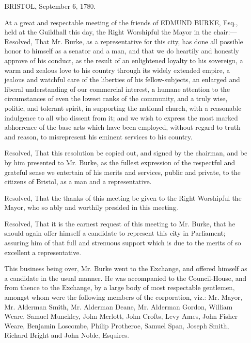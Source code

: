 \begin{itpars}
\hfill
BRISTOL, September 6, 1780.

At a great and respectable meeting of the friends of EDMUND BURKE, Esq., held at the Guildhall this day, the Right Worshipful the Mayor in the chair:—Resolved, That Mr. Burke, as a representative for this city, has done all possible honor to himself as a senator and a man, and that we do heartily and honestly approve of his conduct, as the result of an enlightened loyalty to his sovereign, a warm and zealous love to his country through its widely extended empire, a jealous and watchful care of the liberties of his fellow-subjects, an enlarged and liberal understanding of our commercial interest, a humane attention to the circumstances of even the lowest ranks of the community, and a truly wise, politic, and tolerant spirit, in supporting the national church, with a reasonable indulgence to all who dissent from it; and we wish to express the most marked abhorrence of the base arts which have been employed, without regard to truth and reason, to misrepresent his eminent services to his country.

Resolved, That this resolution be copied out, and signed by the chairman, and be by him presented to Mr. Burke, as the fullest expression of the respectful and grateful sense we entertain of his merits and services, public and private, to the citizens of Bristol, as a man and a representative.

Resolved, That the thanks of this meeting be given to the Right Worshipful the Mayor, who so ably and worthily presided in this meeting.

Resolved, That it is the earnest request of this meeting to Mr. Burke, that he should again offer himself a candidate to represent this city in Parliament; assuring him of that full and strenuous support which is due to the merits of so excellent a representative.

\PRLsep

This business being over, Mr. Burke went to the Exchange, and offered himself as a candidate in the usual manner. He was accompanied to the Council-House, and from thence to the Exchange, by a large body of most respectable gentlemen, amongst whom were the following members of the corporation, viz.: Mr. Mayor, Mr. Alderman Smith, Mr. Alderman Deane, Mr. Alderman Gordon, William Weare, Samuel Munckley, John Merlott, John Crofts, Levy Ames, John Fisher Weare, Benjamin Loscombe, Philip Protheroe, Samuel Span, Joseph Smith, Richard Bright and John Noble, Esquires.
\end{itpars}

